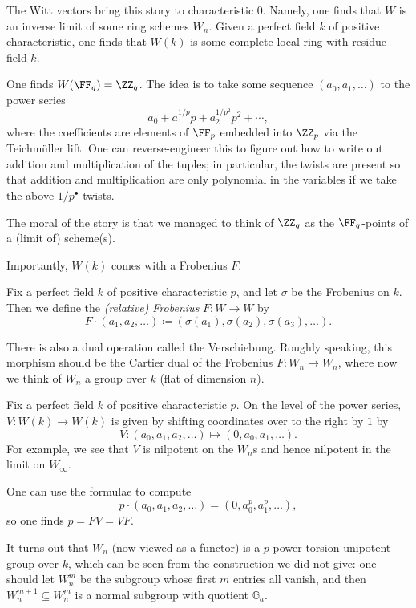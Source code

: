 \documentclass[../notes.tex]{subfiles}
\begin{document}
The Witt vectors bring this story to characteristic $0$. Namely, one finds that $W$ is an inverse limit of some ring schemes $W_n$. Given a perfect field $k$ of positive characteristic, one finds that $W(k)$ is some complete local ring with residue field $k$.
\begin{example}
	One finds $W(\FF_q)=\ZZ_q$. The idea is to take some sequence $(a_0,a_1,\ldots)$ to the power series
	\[a_0+a_1^{1/p}p+a_2^{1/p^2}p^2+\cdots,\]
	where the coefficients are elements of $\FF_p$ embedded into $\ZZ_p$ via the Teichm\"uller lift. One can reverse-engineer this to figure out how to write out addition and multiplication of the tuples; in particular, the twists are present so that addition and multiplication are only polynomial in the variables if we take the above $1/p^\bullet$-twists.
\end{example}
The moral of the story is that we managed to think of $\ZZ_q$ as the $\FF_q$-points of a (limit of) scheme(s).

Importantly, $W(k)$ comes with a Frobenius $F$.
\begin{definition}
	Fix a perfect field $k$ of positive characteristic $p$, and let $\sigma$ be the Frobenius on $k$. Then we define the \textit{(relative) Frobenius} $F\colon W\to W$ by
	\[F\cdot(a_1,a_2,\ldots)\coloneqq\left(\sigma(a_1),\sigma(a_2),\sigma(a_3),\ldots\right).\]
\end{definition}
There is also a dual operation called the Verschiebung. Roughly speaking, this morphism should be the Cartier dual of the Frobenius $F\colon W_n\to W_n$, where now we think of $W_n$ a group over $k$ (flat of dimension $n$).
\begin{definition}
	Fix a perfect field $k$ of positive characteristic $p$. On the level of the power series, $V\colon W(k)\to W(k)$ is given by shifting coordinates over to the right by $1$ by
	\[V\colon(a_0,a_1,a_2,\ldots)\mapsto(0,a_0,a_1,\ldots).\]
	For example, we see that $V$ is nilpotent on the $W_n$s and hence nilpotent in the limit on $W_\infty$.
\end{definition}
\begin{example}
	One can use the formulae to compute
	\[p\cdot(a_0,a_1,a_2,\ldots)=(0,a_0^p,a_1^p,\ldots),\]
	so one finds $p=FV=VF$.
\end{example}
\begin{remark}
	It turns out that $W_n$ (now viewed as a functor) is a $p$-power torsion unipotent group over $k$, which can be seen from the construction we did not give: one should let $W_n^m$ be the subgroup whose first $m$ entries all vanish, and then $W_n^{m+1}\subseteq W_n^m$ is a normal subgroup with quotient $\mathbb G_a$.
\end{remark}
\end{document}
